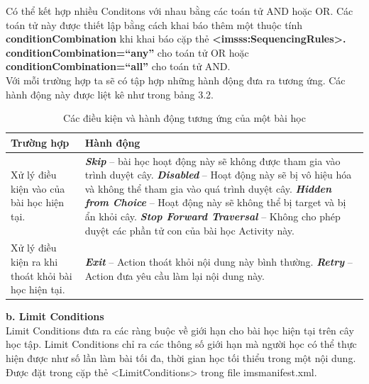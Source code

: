 	Có thể kết hợp nhiều Conditons với nhau bằng các toán tử AND hoặc OR. Các toán tử này được thiết lập bằng cách khai báo thêm một thuộc tính \textbf{conditionCombination} khi khai báo cặp thẻ \textbf{<imsss:SequencingRules>. conditionCombination=“any”} cho toán tử OR hoặc \textbf{conditionCombination=“all”} cho toán tử AND.\\
	
	Với mỗi trường hợp ta sẽ có tập hợp những hành động đưa ra tương ứng. Các hành động này được liệt kê như trong bảng 3.2.
	
	\newpage
	
\begin{table}[!htp]
	
	\begin{tabular}{|p{4cm}|p{10.8cm}|}
		\hline 
		\textbf{Trường hợp} & \hspace{4.6cm}\textbf{Hành động} 
		\\
		\hline 
		Xử lý điều kiện vào của bài học hiện tại. & 
		\textbf{\textit{Skip}} – bài học hoạt động này sẽ không được tham gia vào trình duyệt cây.\newline
		\textbf{\textit{Disabled}} – Hoạt động này sẽ bị vô hiệu hóa và không thể tham gia vào quá trình duyệt cây.\newline
		\textbf{\textit{Hidden from Choice}} – Hoạt động này sẽ không thể bị target và bị ẩn khỏi cây.\newline
		\textbf{\textit{Stop Forward Traversal}} – Không cho phép duyệt các phần tử con của bài học Activity này.
		\\
		\hline 
		Xử lý điều kiện ra khi thoát khỏi bài học hiện tại. & 
		\textbf{\textit{Exit}} – Action thoát khỏi nội dung này bình thường.\newline
		\textbf{\textit{Retry}} – Action đưa yêu cầu làm lại nội dung này.
		\\
		\hline 
	\end{tabular} 
	\caption{Các điều kiện và hành động tương ứng của một bài học}
	\label{reftable42}
\end{table}	
	

 \textbf{b. Limit Conditions}\\
	
	Limit Conditions đưa ra các ràng buộc về giới hạn cho bài học hiện tại trên cây học tập. Limit Conditions chỉ ra các thông số giới hạn mà người học có thể thực hiện được như số lần làm bài tối đa, thời gian học tối thiểu trong một nội dung. Được đặt trong cặp thẻ <LimitConditions> trong file imsmanifest.xml.\\
	
